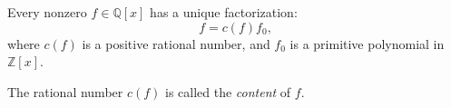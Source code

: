 \begin{proposition}
Every nonzero $f\in\mathbb{Q}[x]$ has a unique factorization:
\[
f=c(f)f_0,
\]
where $c(f)$ is a positive rational number, and $f_0$ is a primitive polynomial in $\mathbb{Z}[x]$.
\end{proposition}
\begin{definition}
The rational number $c(f)$ is called the \emph{content} of $f$.
\end{definition}














